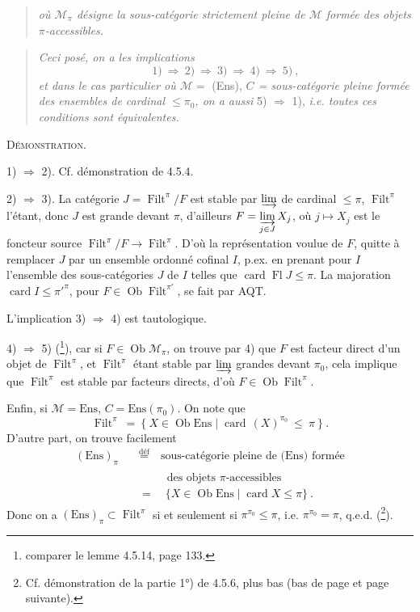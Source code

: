 \documentclass[11pt]{article}
\newcommand{\printedpage}[1]{\marginpar{\footnotesize p.~#1}}
\newcommand{\msp}[1]{\marginpar{\footnotesize [#1]}}
\newcommand{\Filt}{\operatorname{Filt}}
\newcommand{\Ob}{\operatorname{Ob}}
\newcommand{\card}{\operatorname{card}}
\newcommand{\Fl}{\operatorname{Fl}}
\newcommand{\Ens}{\mathrm{Ens}}
\begin{document}
\setcounter{footnote}{39}

\printedpage{34}

\msp{page 117}

\begin{quote}
\textit{où $\mathcal{M}_\pi$ désigne la sous-catégorie strictement pleine de $\mathcal{M}$ formée des objets $\pi$-accessibles.}
\end{quote}

\begin{quote}
\textit{Ceci posé, on a les implications}
\[
\mathrm{1)} \ \Longrightarrow\ \mathrm{2)} \ \Longrightarrow\ \mathrm{3)} \ \Longrightarrow\ \mathrm{4)} \ \Longrightarrow\ \mathrm{5)} \ ,
\]
\textit{et dans le cas particulier où $\mathcal{M} = $} (Ens), \textit{$C$ = sous-catégorie pleine formée des ensembles de cardinal $\leqslant \pi_0$, on a aussi} 5) $\Longrightarrow$ 1), \textit{i.e. toutes ces conditions sont équivalentes.}
\end{quote}

\textsc{Démonstration.}

1) $\Longrightarrow$ 2). Cf. démonstration de 4.5.4.

2) $\Longrightarrow$ 3). La catégorie $J = \Filt^\pi/F$ est stable par $\varinjlim$ de cardinal $\leqslant \pi$, $\Filt^\pi$ l'étant, donc $J$ est grande devant $\pi$, d'ailleurs $F = \varinjlim\limits_{j\in J} X_j$, où $j \longmapsto X_j$ est le foncteur source $\Filt^\pi/F \longrightarrow \Filt^\pi$. D'où la représentation voulue de $F$, quitte à remplacer $J$ par un ensemble ordonné cofinal $I$, p.ex. en prenant pour $I$ l'ensemble des sous-catégories $J$ de $I$ telles que $\card \Fl J \leqslant \pi$. La majoration $\card I \leqslant \pi'^{\pi}$, pour $F \in \Ob \Filt^{\pi'}$, se fait par AQT.

L'implication 3) $\Longrightarrow$ 4) est tautologique.

4) $\Longrightarrow$ 5) (\footnote{comparer le lemme 4.5.14, page 133.}), car si $F \in \Ob \mathcal{M}_\pi$, on trouve par 4) que $F$ est facteur direct d'un objet de $\Filt^\pi$, et $\Filt^\pi$ étant stable par $\varinjlim$
\msp{page 118}
grandes devant $\pi_0$, cela implique que $\Filt^\pi$ est stable par facteurs directs, d'où $F \in \Ob \Filt^\pi$.

Enfin, si $\mathcal{M} = \Ens$, $C = \Ens(\pi_0)$. On note que
\[
\Filt^\pi \ = \ \{ \ X \in \Ob \Ens \mid \card\,(X)^{\pi_0} \ \leqslant \ \pi \ \} \ .
\]
D'autre part, on trouve facilement
\[
\begin{aligned}
(\Ens)_\pi \quad &\overset{\text{déf}}{=} \quad \text{sous-catégorie pleine de (Ens) formée} \\
&\phantom{\overset{\text{déf}}{=}} \quad \text{des objets $\pi$-accessibles} \\
&= \quad \{ X \in \Ob \Ens \mid \card X \leqslant \pi \} \ .
\end{aligned}
\]
Donc on a $(\Ens)_\pi \subset \Filt^\pi$ si et seulement si $\pi^{\pi_0} \leqslant \pi$, i.e. $\pi^{\pi_0} = \pi$, q.e.d. (\footnote{Cf. démonstration de la partie 1°) de 4.5.6, plus bas (bas de page et page suivante).}).
\end{document}
